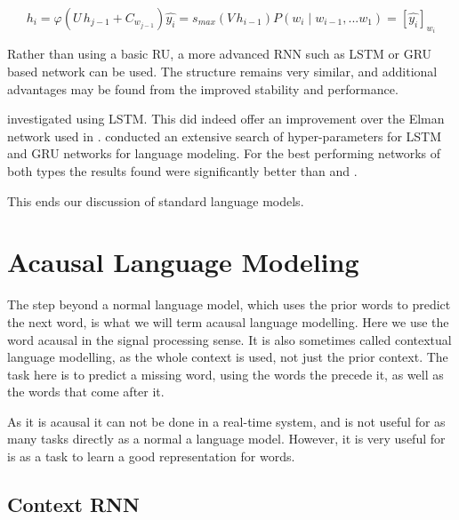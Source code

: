 \documentclass[parskip]{komatufte}
\begin{document}
\begin{equation}
	h_{i} = \varphi\left( U\,h_{j-1} + C_{w_{j-1}} \right)
	\hat{y_i} = s_{max}\left(V \, h_{i-1} \right)
	P(w_i \mid w_{i-1}, ... w_{1}) = \left[ \hat{y_i} \right]_{w_i}
\end{equation}


Rather than using a basic RU, a more advanced RNN such as LSTM or GRU based network can be used.
The structure remains very similar,
and additional advantages may be found from the improved stability and performance.

 investigated using LSTM.
This did indeed offer an improvement over the Elman network used in \textcite{mikolov2010recurrent}.
 conducted an extensive search of hyper-parameters for LSTM and GRU networks for language modeling.
For the best performing networks of both types the results found were significantly better than \textcite{sundermeyer2012lstm} and \textcite{mikolov2010recurrent}.



This ends our discussion of standard language models.

\section{Acausal Language Modeling}
The step beyond a normal language model,
which uses the prior words to predict the next word, is what we will term acausal language modelling.
Here we use the word acausal in the signal processing sense.
It is also sometimes called contextual language modelling, as the whole context is used, not just the prior context.
The task here is to predict a missing word, using the words the precede it, as well as the words that come after it.

As it is acausal it can not be done in a real-time system, and is not useful for as many tasks directly as a normal a language model. 
However, it is very useful for is as a task to learn a good representation for words.


\subsection{Context RNN}
\end{document}
